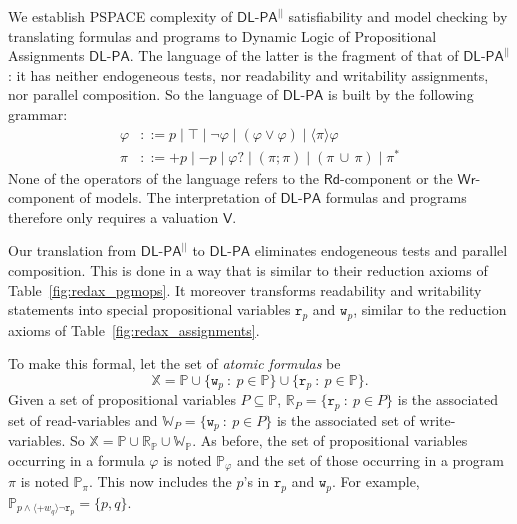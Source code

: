 \documentclass{llncs}
\newcommand{\atm}{x}
\newcommand{\atmb}{y}
\newcommand{\atmset}{\mathtt{\mathbb X}}	%
\newcommand{\pll}{ {||} }							%
\newcommand{\readOf}[1]{\mathbb{R}_{#1}}
\newcommand{\readable}[1]{\mathtt{r}_{#1}}
\newcommand{\readset}{\mathsf{Rd}}
\newcommand{\valuset}{\mathsf{V}}
\newcommand{\writable}[1]{\mathtt{w}_{#1}}
\newcommand{\writeset}{\mathsf{Wr}}
\newcommand{\testendo}{?\!\!?}			%
\newcommand{\testpdl}{?}				%
\newcommand{\writeOf}[1]{\mathbb{W}_{#1}}
\newcommand{\Dlpa}{\ensuremath{\mathsf{DL\text{-}PA}}\xspace}
\newcommand{\DlpaPll}{\ensuremath{\mathsf{DL\text{-}PA}^\pll}\xspace}
\newcommand{\assgntopR}[1]{{\mathtt r {+} #1}}
\newcommand{\assgnbotR}[1]{{\mathtt r {-} #1}}
\newcommand{\assgntopW}[1]{{\mathtt w {+} #1}}
\newcommand{\assgnbotW}[1]{{\mathtt w {-} #1}}
\newcommand{\assgntopV}[1]{{\mathtt {+} #1}}
\newcommand{\assgnbotV}[1]{{\mathtt {-} #1}}
\newcommand{\ldia}[1]{ \big\langle #1 \big\rangle}
\newcommand{\ndet}{\,{\cup}\,}
\renewcommand{\phi}{\varphi}
\newcommand{\propset}{\mathbb P}
\newcommand{\propsetOf}[1]{\propset_{#1}}
\newcommand{\suchthat}{~ : ~}
\begin{document}
We establish PSPACE complexity of \DlpaPll satisfiability and model checking by translating formulas and programs to 
Dynamic Logic of Propositional Assignments \Dlpa. 
The language of the latter is the fragment of that of \DlpaPll:
it has neither endogeneous tests, nor readability and writability assignments, nor parallel composition. 
So the language of \Dlpa is built by the following grammar: 
\begin{align*}
\phi & ::= p \mid \top \mid \lnot \phi \mid (\phi \lor \phi) \mid \ldia \pi \phi
\\
\pi & ::= \assgntopV p \mid \assgnbotV p \mid
			\phi \testpdl \mid 
			(\pi ; \pi) \mid (\pi \ndet \pi) \mid 
			\pi^\ast 
\end{align*} 
None of the operators of the language refers to the $\readset$-component or the $\writeset$-component of models. 
The interpretation of \Dlpa formulas and programs therefore only requires a valuation $\valuset$. 

Our translation from \DlpaPll to \Dlpa eliminates endogeneous tests and parallel composition. 
This is done in a way that is similar to their reduction axioms of Table~\ref{fig:redax_pgmops}.
It moreover transforms readability and writability statements into special propositional variables $\readable p$ and $\writable p$, similar to the reduction axioms of Table~\ref{fig:redax_assignments}.

To make this formal, let the set of \emph{atomic formulas} be
$$ \atmset = \propset \cup \{ \writable{p} \suchthat p \in \propset \} \cup \{ \readable p \suchthat p \in \propset \} . $$
Given a set of propositional variables $P \subseteq \propset$, 
$\readOf P = \{ \readable p \suchthat p \in P \}$ 
is the associated set of read-variables and 
$\writeOf P = \{ \writable{p} \suchthat p \in P \}$ 
is the associated set of write-variables. 
So $\atmset = \propset \cup \readOf \propset \cup \writeOf \propset$. 
%
As before, the set of propositional variables occurring in a formula $\phi$ is noted $\propsetOf \phi $ and 
the set of those occurring in a program $\pi$ is noted $\propsetOf \pi $. %
This now includes the $p$'s in $\readable p$ and $\writable{p}$. 
For example, $\propsetOf{ p \land \ldia{\assgntopV{w_q} } \lnot \readable p } = \{p,q\}$. %
\end{document}
